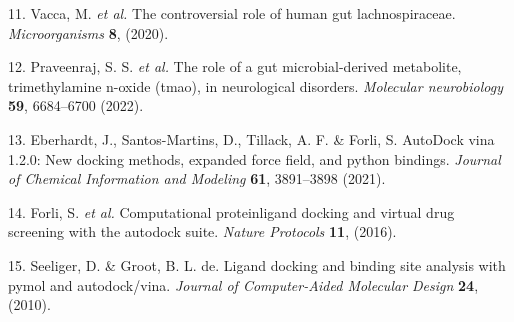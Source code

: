 \documentclass[
]{article}
\newenvironment{cslreferences}%
  {}%
  {\par}
\begin{document}
\begin{cslreferences}
\leavevmode\hypertarget{ref-TheControversiVacca2020}{}%
11. Vacca, M. \emph{et al.} The controversial role of human gut lachnospiraceae. \emph{Microorganisms} \textbf{8}, (2020).

\leavevmode\hypertarget{ref-TheRoleOfAGPravee2022}{}%
12. Praveenraj, S. S. \emph{et al.} The role of a gut microbial-derived metabolite, trimethylamine n-oxide (tmao), in neurological disorders. \emph{Molecular neurobiology} \textbf{59}, 6684--6700 (2022).

\leavevmode\hypertarget{ref-AutodockVina1Eberha2021}{}%
13. Eberhardt, J., Santos-Martins, D., Tillack, A. F. \& Forli, S. AutoDock vina 1.2.0: New docking methods, expanded force field, and python bindings. \emph{Journal of Chemical Information and Modeling} \textbf{61}, 3891--3898 (2021).

\leavevmode\hypertarget{ref-ComputationalPForli2016}{}%
14. Forli, S. \emph{et al.} Computational proteinligand docking and virtual drug screening with the autodock suite. \emph{Nature Protocols} \textbf{11}, (2016).

\leavevmode\hypertarget{ref-LigandDockingSeelig2010}{}%
15. Seeliger, D. \& Groot, B. L. de. Ligand docking and binding site analysis with pymol and autodock/vina. \emph{Journal of Computer-Aided Molecular Design} \textbf{24}, (2010).
\end{cslreferences}
\end{document}
